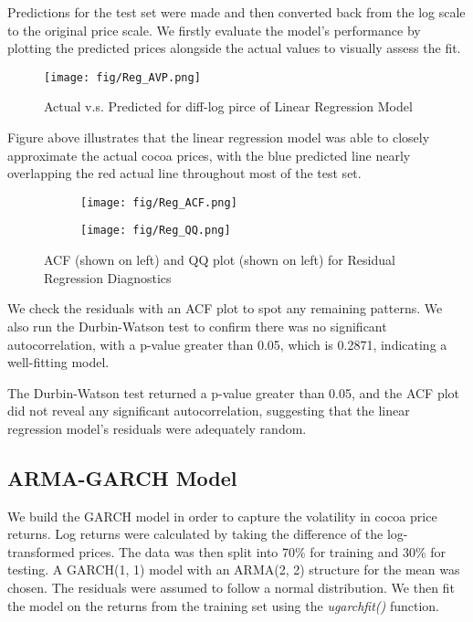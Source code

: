 \documentclass[10pt]{article}
\begin{document}
\noindent
Predictions for the test set were made and then converted back from the log scale to the original price scale. We firstly evaluate the model's performance by plotting the predicted prices alongside the actual values to visually assess the fit.

\begin{figure}[ht]
    \centering
    \captionsetup{font=scriptsize}
    \texttt{[image: fig/Reg\_AVP.png]}
    \caption{\scriptsize Actual v.s. Predicted for diff-log pirce of Linear Regression Model}
    \label{fig:enter-label}
\end{figure}
\noindent
Figure above illustrates that the linear regression model was able to closely approximate the actual cocoa prices, with the blue predicted line nearly overlapping the red actual line throughout most of the test set.

\begin{figure}[h!]
    \captionsetup{font=scriptsize}
    \centering
    \begin{subfigure}[b]{0.47\textwidth}
        \centering
        \texttt{[image: fig/Reg\_ACF.png]}
        \label{fig:m5_c2}
    \end{subfigure}
    \begin{subfigure}[b]{0.47\textwidth}
        \centering
        \texttt{[image: fig/Reg\_QQ.png]}
        \label{fig:m5_qq}
    \end{subfigure}
    \caption{ACF (shown on left) and QQ plot (shown on left) for Residual Regression Diagnostics}
    \label{fig:res}
\end{figure}

\noindent
We check the residuals with an ACF plot to spot any remaining patterns. We also run the Durbin-Watson test to confirm there was no significant autocorrelation, with a p-value greater than 0.05, which is 0.2871, indicating a well-fitting model. 

\noindent
The Durbin-Watson test returned a p-value greater than 0.05, and the ACF plot did not reveal any significant autocorrelation, suggesting that the linear regression model’s residuals were adequately random.

\subsection{ARMA-GARCH Model}
We build the GARCH model in order to capture the volatility in cocoa price returns. Log returns were calculated by taking the difference of the log-transformed prices. The data was then split into 70\% for training and 30\% for testing. A GARCH(1, 1) model with an ARMA(2, 2) structure for the mean was chosen. The residuals were assumed to follow a normal distribution. We then fit the model on the returns from the training set using the \emph{ugarchfit()} function.
\end{document}
